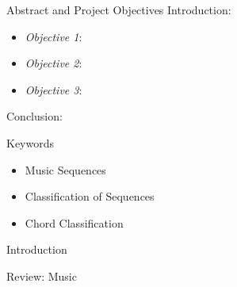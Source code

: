 


\setlength{\belowcaptionskip}{2ex}
\setlength\belowdisplayshortskip{2ex}
\begin{frame}[t]
\begin{columns}[t]
\begin{column}{\onecolwid} %
\begin{alertblock}{Abstract and Project Objectives}
Introduction:
\begin{itemize}
\item \textit{Objective 1}: 
\item \textit{Objective 2}: 
\item \textit{Objective 3}: 
\end{itemize}
Conclusion:
\end{alertblock}
\begin{block}{Keywords}
\begin{itemize}
\item Music Sequences
\item Classification of Sequences
\item Chord Classification
\end{itemize}	
\end{block}
\begin{alertblock}{Introduction}
\end{alertblock}
\begin{alertblock}{Review: Music}


\end{alertblock}
\end{column}
\end{columns}
\end{frame}
